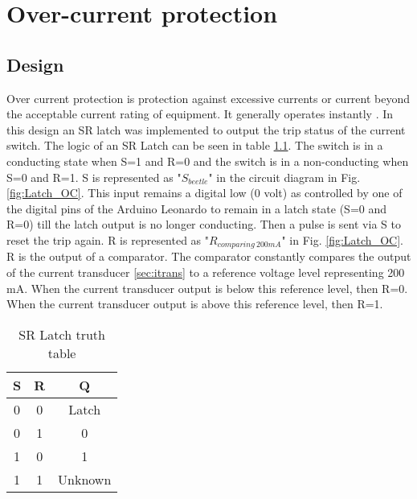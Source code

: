\chapter{Over-current protection} \label{sec:OC}


\section{Design} \label{sec:sw_design}

Over current protection is protection against excessive currents or current beyond the acceptable current rating of equipment. It generally operates instantly \cite{OverC}. In this design an SR latch \cite{SR_Latch} was implemented to output the trip status of the current switch. The logic of an SR Latch can be seen in table \ref{SRTT}. The switch is in a conducting state when S=1 and R=0 and the switch is in a non-conducting  when S=0 and R=1. S is represented as "$S_{beetle}$" in the circuit diagram in Fig. \ref{fig:Latch_OC}. This input remains a digital low (0 volt) as controlled by one of the digital pins of the Arduino Leonardo \cite{beetle} to remain in a latch state (S=0 and R=0) till the latch output is no longer conducting. Then a pulse is sent via S to reset the trip again. R is represented as "$R_{comparing \ 200mA}$" in Fig. \ref{fig:Latch_OC}. R is the output of a comparator. The comparator constantly compares the output of the current transducer \ref{sec:itrans} to a reference voltage level representing 200 mA. When the current transducer output is below this reference level, then R=0. When the current transducer output is above this reference level, then R=1.



\begin{table}[H]
\centering
\caption{SR Latch truth table}
\begin{tabular}{|c|c|c|}
\hline
S & R & Q     \\ \hline
0 & 0 & Latch \\ \hline
0 & 1 & 0     \\ \hline
1 & 0 & 1     \\ \hline
1 & 1 & Unknown     \\ \hline
\end{tabular}
\label{SRTT}
\end{table}



